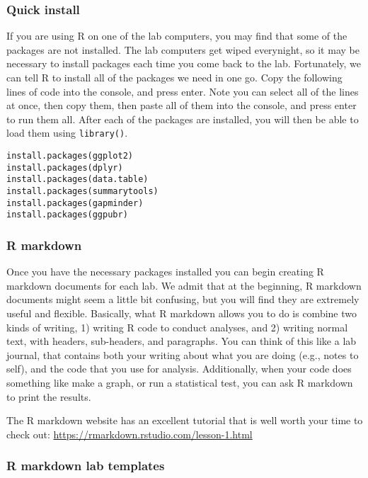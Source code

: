 \documentclass[
]{book}
\begin{document}
\hypertarget{quick-install}{%
\subsubsection{Quick install}\label{quick-install}}

If you are using R on one of the lab computers, you may find that some of the packages are not installed. The lab computers get wiped everynight, so it may be necessary to install packages each time you come back to the lab. Fortunately, we can tell R to install all of the packages we need in one go. Copy the following lines of code into the console, and press enter. Note you can select all of the lines at once, then copy them, then paste all of them into the console, and press enter to run them all. After each of the packages are installed, you will then be able to load them using \texttt{library()}.

\begin{verbatim}
install.packages(ggplot2)
install.packages(dplyr)
install.packages(data.table)
install.packages(summarytools)
install.packages(gapminder)
install.packages(ggpubr)
\end{verbatim}

\hypertarget{r-markdown}{%
\subsubsection{R markdown}\label{r-markdown}}

Once you have the necessary packages installed you can begin creating R markdown documents for each lab. We admit that at the beginning, R markdown documents might seem a little bit confusing, but you will find they are extremely useful and flexible. Basically, what R markdown allows you to do is combine two kinds of writing, 1) writing R code to conduct analyses, and 2) writing normal text, with headers, sub-headers, and paragraphs. You can think of this like a lab journal, that contains both your writing about what you are doing (e.g., notes to self), and the code that you use for analysis. Additionally, when your code does something like make a graph, or run a statistical test, you can ask R markdown to print the results.

The R markdown website has an excellent tutorial that is well worth your time to check out: \url{https://rmarkdown.rstudio.com/lesson-1.html}

\hypertarget{r-markdown-lab-templates}{%
\subsubsection{R markdown lab templates}\label{r-markdown-lab-templates}}
\end{document}
